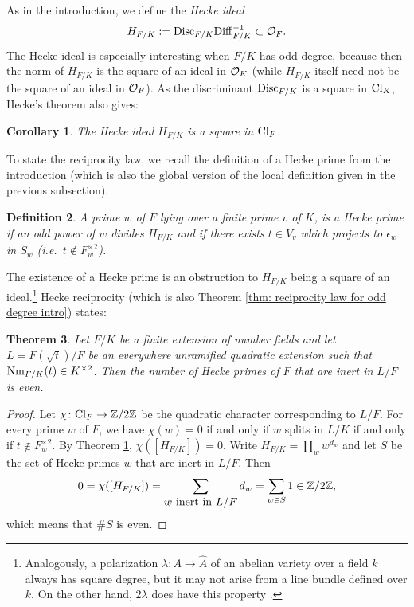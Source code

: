 \documentclass[11pt,a4paper]{amsart}
\def\Z{{\rm \mathbb{Z}}}
\def\O{{\rm \mathcal{O}}}
\def\Nm{{\rm Nm}}
\def\Cl{{\rm Cl}}
\def\Disc{{\rm Disc}}
\numberwithin{equation}{section}
\newtheorem{theorem}{Theorem}[section]
\newtheorem{definition}[theorem]{Definition}
\newtheorem{corollary}[theorem]{Corollary}
\begin{document}
As in the introduction, we define the {\it Hecke ideal} 
\[H_{F/K} := \Disc_{F/K} \mathrm{Diff}_{F/K}^{-1} \subset \O_F.\] The Hecke ideal is especially interesting when $F/K$ has odd degree, because then the norm of $H_{F/K}$ is the square of an ideal in $\O_K$ (while $H_{F/K}$ itself need not be the square of an ideal in $\O_F$).  As the discriminant $\Disc_{F/K}$ is a square in $\Cl_K$, Hecke's theorem also gives:

\begin{corollary}\label{cor: hecke ideal}
    The Hecke ideal $H_{F/K}$ is a square in $\Cl_F$.
\end{corollary}

To state the reciprocity law, we recall the definition of a Hecke prime from the introduction (which is also the global version of the local definition given in the previous subsection). 
\begin{definition}
{\em 
A prime $w$ of $F$ lying over a finite prime $v$ of $K$, is a {\it Hecke prime} if an odd power of $w$ divides $H_{F/K}$ and if there exists $t \in V_v$ which projects to $\epsilon_w$ in $S_w$ (i.e.\ $t \notin F_w^{\times 2}$). 
}
\end{definition}


The existence of a Hecke prime is an obstruction to $H_{F/K}$ being a square of an ideal.\footnote{Analogously, a polarization $\lambda \colon A \to \hat{A}$ of an abelian variety over a field $k$ always has square degree, but it may not arise from a line bundle defined over $k$. On the other hand, $2\lambda$ does have this property \cite[\S20]{MumfordAbelianVarieties}.}  Hecke reciprocity (which is also Theorem \ref{thm: reciprocity law for odd degree intro}) states:

\begin{theorem}\label{thm: hecke reciprocity}
    Let $F/K$ be a finite extension of number fields and let $L = F(\sqrt{t})/F$ be an everywhere unramified quadratic extension such that $\Nm_{F/K}(t) \in K^{\times 2}$.  Then the number of Hecke primes of $F$ that are inert in $L/F$ is even.
\end{theorem}

\begin{proof}
    Let $\chi \colon \Cl_F \to \Z/2\Z$ be the quadratic character corresponding to $L/F$. For every prime $w$ of $F$, we have $\chi(w) = 0$ if and only if $w$ splits in $L/K$ if and only if $t \notin F_w^{\times 2}$. By Theorem \ref{cor: hecke ideal}, $\chi([H_{F/K}]) = 0$. Write $H_{F/K} = \prod_w w^{d_w}$ and let $S$ be the set of Hecke primes $w$ that are inert in $L/F$.  Then 
    \[0 = \chi([H_{F/K}]) = \sum_{\mbox{$w$ inert in $L/F$}} d_w= \sum_{w \in S} 1 \in \Z/2\Z,\] 
which means that $\#S$ is even. 
\end{proof}
\end{document}
